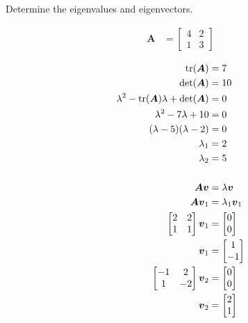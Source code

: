 Determine the eigenvalues and eigenvectors.

\begin{align*}
    \boldsymbol{A} &= \begin{bmatrix}
        4 & 2 \\
        1 & 3
    \end{bmatrix}
\end{align*}

\begin{solution}
    \begin{align*}
        \operatorname{tr}(\boldsymbol{A}) &= 7 \\
        \det(\boldsymbol{A}) &= 10 \\
        \lambda^2 - \operatorname{tr}(\boldsymbol{A})\lambda + \det(\boldsymbol{A}) &= 0 \\
        \lambda^2 - 7\lambda + 10 &= 0 \\
        (\lambda - 5)(\lambda - 2) &= 0 \\
        \lambda_1 &= 2 \\
        \lambda_2 &= 5 \\
        \\
        \boldsymbol{Av} &= \lambda\boldsymbol{v} \\
        \boldsymbol{Av}_1 &= \lambda_1\boldsymbol{v}_1 \\
        \begin{bmatrix}
            2 & 2 \\
            1 & 1
        \end{bmatrix}\boldsymbol{v}_1 &= \begin{bmatrix}
            0 \\ 0
        \end{bmatrix} \\
        \boldsymbol{v}_1 &= \begin{bmatrix}
            1 \\ -1
        \end{bmatrix} \\
        \begin{bmatrix}
            -1 & 2 \\
            1 & -2
        \end{bmatrix}\boldsymbol{v}_2 &= \begin{bmatrix}
            0 \\ 0
        \end{bmatrix} \\
        \boldsymbol{v}_2 &= \begin{bmatrix}
            2 \\ 1
        \end{bmatrix}
    \end{align*}
\end{solution}